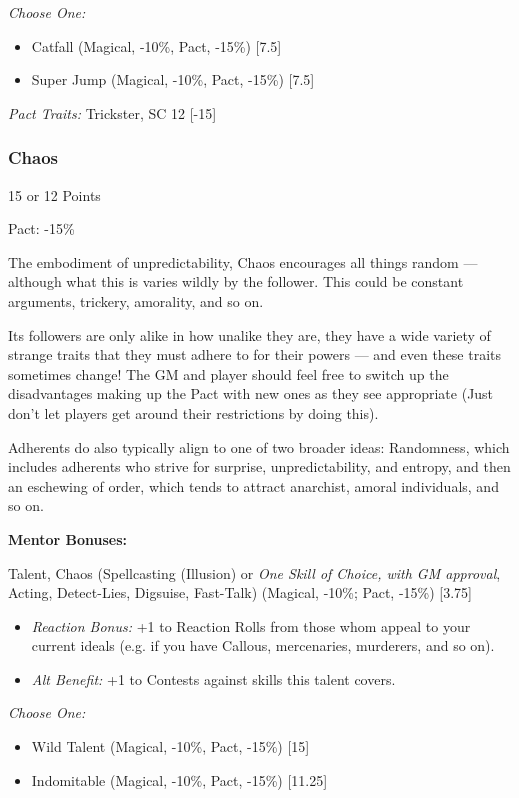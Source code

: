 \begin{multicols}{3}
	\textit{Choose One:}
	\begin{itemize}
		\itemsep 0pt
		\item Catfall (Magical, -10\%, Pact, -15\%) [7.5]
		\item Super Jump (Magical, -10\%, Pact, -15\%) [7.5]
	\end{itemize}
	
	
	\textit{Pact Traits:} Trickster, SC 12 [-15]
	
	\subsubsection{Chaos}
	\begin{flushright}
		15 or 12 Points
	\end{flushright}
	Pact: -15\%
	
	The embodiment of unpredictability, Chaos encourages all things random — although what this is varies wildly by the follower. This could be constant arguments, trickery, amorality, and so on.
	
	Its followers are only alike in how unalike they are, they have a wide variety of strange traits that they must adhere to for their powers — and even these traits sometimes change! The GM and player should feel free to switch up the disadvantages making up the Pact with new ones as they see appropriate (Just don't let players get around their restrictions by doing this). 
	
	Adherents do also typically align to one of two broader ideas: Randomness, which includes adherents who strive for surprise, unpredictability, and entropy, and then an eschewing of order, which tends to attract anarchist, amoral individuals, and so on.
	
	\textbf{Mentor Bonuses:} 
	
	Talent, Chaos (Spellcasting (Illusion) or \textit{One Skill of Choice, with GM approval}, Acting, Detect-Lies, Digsuise, Fast-Talk) (Magical, -10\%; Pact, -15\%) [3.75]
	\begin{itemize}
		\itemsep 0pt
		\item \textit{Reaction Bonus:} +1 to Reaction Rolls from those whom appeal to your current ideals (e.g. if you have Callous, mercenaries, murderers, and so on).
		\item \textit{Alt Benefit:} +1 to Contests against skills this talent covers.
	\end{itemize}
	
	\textit{Choose One:}
	\begin{itemize}
		\itemsep 0pt
		\item Wild Talent (Magical, -10\%, Pact, -15\%) [15]
		\item Indomitable (Magical, -10\%, Pact, -15\%) [11.25]
	\end{itemize}
	

\end{multicols}
